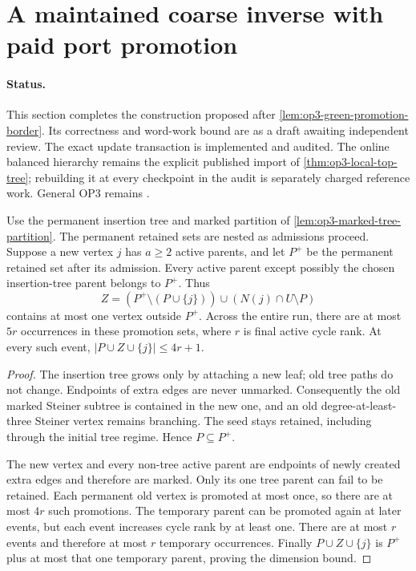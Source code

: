\section[Maintained coarse inverse]{A maintained coarse inverse with paid port promotion}
\label{sec:op3-maintained-inverse}

\paragraph{Status.}
This section completes the construction proposed after
\cref{lem:op3-green-promotion-border}. Its correctness and word-work bound
are \statusproved{} as a draft awaiting independent review. The exact
update transaction is implemented and audited. The online balanced
hierarchy remains the explicit published \statussource{} import of
\cref{thm:op3-local-top-tree}; rebuilding it at every checkpoint in the
audit is separately charged reference work. General OP3 remains
\statusopen{}.

\begin{lemma}
\label{lem:op3-monotone-coarse-ports}
Use the permanent insertion tree and marked partition of
\cref{lem:op3-marked-tree-partition}. The permanent retained sets are
nested as admissions proceed. Suppose a new vertex $j$ has $a\geq2$
active parents, and let $P^+$ be the permanent retained set after its
admission. Every active parent except possibly the chosen insertion-tree
parent belongs to $P^+$. Thus
\[
 Z=(P^+\setminus(P\cup\{j\}))\cup(N(j)\cap U\setminus P)
\]
contains at most one vertex outside $P^+$. Across the entire run, there
are at most $5r$ occurrences in these promotion sets, where $r$ is final
active cycle rank. At every such event, $|P\cup Z\cup\{j\}|\leq4r+1$.
\end{lemma}
\begin{proof}
The insertion tree grows only by attaching a new leaf; old tree paths
do not change. Endpoints of extra edges are never unmarked. Consequently
the old marked Steiner subtree is contained in the new one, and an old
degree-at-least-three Steiner vertex remains branching. The seed stays
retained, including through the initial tree regime. Hence $P\subseteq P^+$.

The new vertex and every non-tree active parent are endpoints of newly
created extra edges and therefore are marked. Only its one tree parent
can fail to be retained. Each permanent old vertex is promoted at most
once, so there are at most $4r$ such promotions. The temporary parent can
be promoted again at later events, but each event increases cycle rank by
at least one. There are at most $r$ events and therefore at most $r$
temporary occurrences. Finally $P\cup Z\cup\{j\}$ is $P^+$ plus at most
that one temporary parent, proving the dimension bound.
\end{proof}

